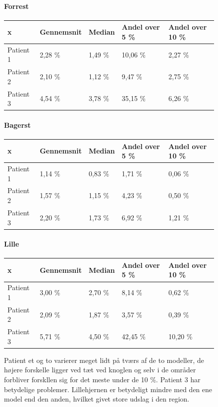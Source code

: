 \begin{figure}
\paragraph{Forrest}

\begin{center}
    \begin{tabular}{| l | l | l | l | l |}
    \hline
    x & Gennemsnit & Median & Andel over 5 \% & Andel over 10 \% \\ \hline
    Patient 1 & 2,28 \% & 1,49 \% & 10,06 \% & 2,27 \% \\ \hline
    Patient 2 & 2,10 \% & 1,12 \% & 9,47 \% & 2,75 \% \\ \hline
    Patient 3 & 4,54 \% & 3,78 \% & 35,15 \% & 6,26 \% \\ \hline
    \end{tabular}
\end{center}

\paragraph{Bagerst}

\begin{center}
    \begin{tabular}{| l | l | l | l | l |}
    \hline
    x & Gennemsnit & Median & Andel over 5 \% & Andel over 10 \% \\ \hline
    Patient 1 & 1,14 \% & 0,83 \% & 1,71 \% & 0,06 \% \\ \hline
    Patient 2 & 1,57 \% & 1,15 \% & 4,23 \% & 0,50 \% \\ \hline
    Patient 3 & 2,20 \% & 1,73 \% & 6,92 \% & 1,21 \% \\ \hline
    \end{tabular}
\end{center}

\paragraph{Lille}

\begin{center}
    \begin{tabular}{| l | l | l | l | l |}
    \hline
    x & Gennemsnit & Median & Andel over 5 \% & Andel over 10 \% \\ \hline
    Patient 1 & 3,00 \% & 2,70 \% & 8,14 \% & 0,62 \% \\ \hline
    Patient 2 & 2,09 \% & 1,87 \% & 3,57 \% & 0,39 \% \\ \hline
    Patient 3 & 5,71 \% & 4,50 \% & 42,45 \% & 10,20 \% \\ \hline
    \end{tabular}
\end{center}

Patient et og to varierer meget lidt på tværs af de to modeller, de højere
forskelle ligger ved tæt ved knoglen og selv i de områder forbliver
forskllen sig for det meste under de 10 \%. Patient 3 har betydelige
problemer. Lillehjernen er betydeligt mindre med den ene model end den
anden, hvilket givet store udslag i den region. 





\end{figure}
